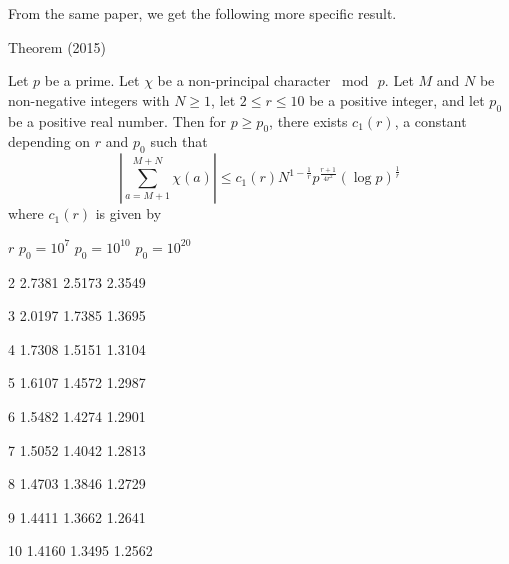 \par 
  From the same paper, we get the following more specific result.
\par 
\begin{thm}{Theorem (2015)}

Let $p$ be a prime. Let $\chi$ be a non-principal character
$\bmod{\,p}$. Let $M$ and $N$ be non-negative integers with $N\ge 1$,
let $2\le r\le 10$ be a positive integer, and let $p_0$ be a positive
real number. Then for $p \ge p_0$, there exists $c_1(r)$, a constant
depending on $r$ and $p_0$ such that 
$$
\left|\sum_{a=M+1}^{M+N}\chi(a)\right|
\le
c_1(r) N^{1-\frac{1}{r}} p^{\frac{r+1}{4r^2}}(\log{p})^{\frac{1}{r}}
$$
where $c_1(r)$ is given by

  
  
    
      $r$
      $p_0=10^7$
      $p_0=10^{10}$
      $p_0=10^{20}$
    
  
  
    2
    2.7381
    2.5173
    2.3549
  
  
    3
    2.0197
    1.7385
    1.3695
  
  
    4
    1.7308
    1.5151
    1.3104
  
  
    5
    1.6107
    1.4572
    1.2987
  
  
    6
    1.5482
    1.4274
    1.2901
  
  
    7
    1.5052
    1.4042
    1.2813
  
  
    8
    1.4703
    1.3846
    1.2729
  
  
    9
    1.4411
    1.3662
    1.2641
  
  
    10
    1.4160
    1.3495
    1.2562
  


\end{thm}

\par 

